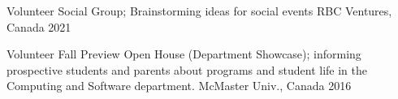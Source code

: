 

\begin{cvhonors}



\cvhonor
{Volunteer} %
{Social Group; Brainstorming ideas for social events} %
{RBC Ventures, Canada} %
{2021} %



  \cvhonor
    {Volunteer} %
    {Fall Preview Open House (Department Showcase); informing prospective students and parents about programs and student life in the Computing and Software department.} %
    {McMaster Univ., Canada} %
    {2016} %
    
\end{cvhonors}
